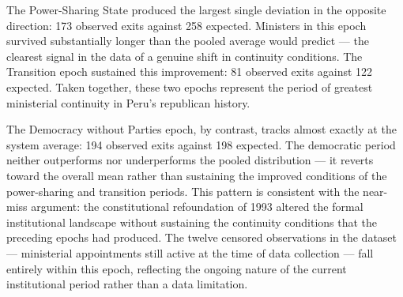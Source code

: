 \documentclass[doc, 12pt, a4paper,floatsintext]{apa7}
\begin{document}
The Power-Sharing State produced the largest single deviation in 
the opposite direction: 173 observed exits against 258 expected. 
Ministers in this epoch survived substantially longer than the 
pooled average would predict --- the clearest signal in the data 
of a genuine shift in continuity conditions. The Transition epoch 
sustained this improvement: 81 observed exits against 122 expected. 
Taken together, these two epochs represent the period of greatest 
ministerial continuity in Peru's republican history.

The Democracy without Parties epoch, by contrast, tracks almost 
exactly at the system average: 194 observed exits against 198 
expected. The democratic period neither outperforms nor 
underperforms the pooled distribution --- it reverts toward the 
overall mean rather than sustaining the improved conditions of the 
power-sharing and transition periods. This pattern is consistent with the near-miss argument: the 
constitutional refoundation of 1993 altered the formal 
institutional landscape without sustaining the continuity 
conditions that the preceding epochs had produced. The twelve 
censored observations in the dataset --- ministerial appointments 
still active at the time of data collection --- fall entirely 
within this epoch, reflecting the ongoing nature of the current 
institutional period rather than a data limitation.
\end{document}
